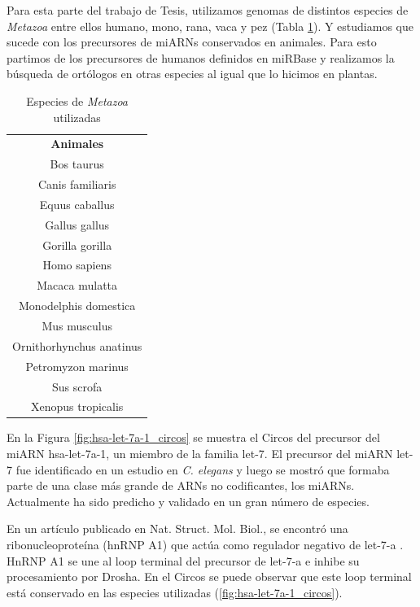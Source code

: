 Para esta parte del trabajo de Tesis, utilizamos genomas de distintos especies de \textit{Metazoa} entre ellos humano, mono, rana, vaca y pez (Tabla \ref{table:db_metazoa}).
Y estudiamos que sucede con los precursores de miARNs conservados en animales.
Para esto partimos de los precursores de humanos definidos en miRBase y realizamos la búsqueda de ortólogos en otras especies al igual que lo hicimos en plantas.

\begin{table}[!htbp]
\centering
\small
\caption{Especies de \textit{Metazoa} utilizadas}
\label{table:db_metazoa}
\begin{tabular}{c}
\rowcolor[HTML]{ECF4FF} 
\textbf{Animales}        \\
	Bos taurus               \\
	Canis familiaris         \\
	Equus caballus           \\
	Gallus gallus            \\
	Gorilla gorilla          \\
	Homo sapiens             \\
	Macaca mulatta           \\
	Monodelphis domestica    \\
	Mus musculus             \\
	Ornithorhynchus anatinus \\
	Petromyzon marinus       \\
	Sus scrofa               \\
	Xenopus tropicalis      
\end{tabular}
\end{table}

En la Figura \ref{fig:hsa-let-7a-1_circos} se muestra el Circos del precursor del miARN hsa-let-7a-1, un miembro de la familia let-7.
El precursor del miARN let-7 fue identificado en un estudio en \textit{C. elegans} y luego se mostró que formaba parte de una clase más grande de ARNs no codificantes, los miARNs.
Actualmente ha sido predicho y validado en un gran número de especies.

En un artículo publicado en Nat. Struct. Mol. Biol., se encontró una ribonucleoproteína (hnRNP A1) que actúa como regulador negativo de let-7-a \citep{pmid20639884}.
HnRNP A1 se une al loop terminal del precursor de let-7-a e inhibe su procesamiento por Drosha.
En el Circos se puede observar que este loop terminal está conservado en las especies utilizadas (\ref{fig:hsa-let-7a-1_circos}).

